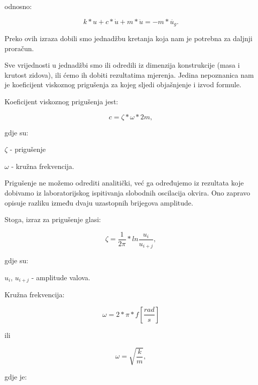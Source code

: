 \documentclass[12pt]{book}
\begin{document}
odnosno:

\begin{equation}\label{Jednadžba 3.11}
	k*u + c*\dot{u} + m*\ddot{u} = - m*\ddot{u_g}.
\end{equation}

Preko ovih izraza dobili smo jednadžbu kretanja koja nam je potrebna za daljnji proračun.

Sve vrijednosti u jednadžbi smo ili odredili iz dimenzija konstrukcije (masa i krutost zidova), ili ćemo ih dobiti rezultatima mjerenja. Jedina nepoznanica nam je koeficijent viskoznog prigušenja za kojeg sljedi objašnjenje i izvod formule.

\newpage



Koeficijent viskoznog prigušenja jest:

\begin{equation}\label{Jednadžba 3.12}
	c = \zeta * \omega *2m,
\end{equation}

gdje su:

$\zeta$ - prigušenje

$\omega$ - kružna frekvencija.

Prigušenje ne možemo odrediti analitički, već ga određujemo iz rezultata koje dobivamo iz laboratorijskog ispitivanja slobodnih oscilacija okvira. Ono zapravo opisuje razliku između dvaju uzastopnih brijegova amplitude.

Stoga, izraz za prigušenje glasi:

\begin{equation}\label{Jednadžba 3.13}
	\zeta = \frac{1}{2\pi} * ln\frac{u_i}{u_{i+j}},
\end{equation}

gdje su:

$u_i$, $u_{i+j}$ - amplitude valova.

Kružna frekvencija:

\begin{equation}\label{Jednadžba 3.14}
	\omega = 2 * \pi * f
	[\frac{rad}{s}] 
\end{equation}

\begin{center}
	ili
\end{center}

\begin{equation}\label{Jednadžba 3.15}
	\omega = \sqrt{\frac{k}{m}},
\end{equation}

gdje je:
\end{document}
